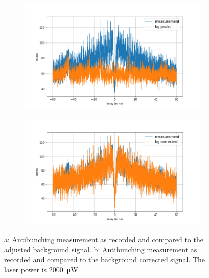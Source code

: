 \begin{figure}[!ht]
    \centering
    \begin{subfigure}{0.47\textwidth}
        \centering
        \includegraphics[width=1.0\textwidth]{img/output_t2/2000.0muW_bg_peaks.png}
    \caption{}
    \end{subfigure}
    \begin{subfigure}{0.47\textwidth}
        \centering
        \includegraphics[width=\textwidth]{img/output_t2/2000.0muW_bg_vgl.png}
        \caption{}
    \end{subfigure}
    \caption{a: Antibunching measurement as recorded and compared to the adjusted background signal. b: Antibunching measurement as recorded and compared to the background corrected signal. The laser power is \SI{2000}{\micro W}.} %
\end{figure}
